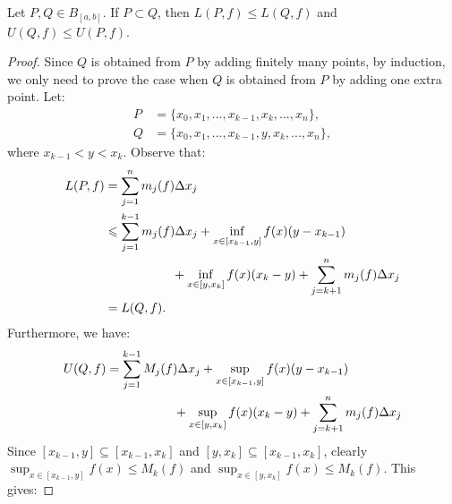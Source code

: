 \documentclass[11pt,twoside,openany]{memoir}
\begin{document}
    \begin{proposition}\label{prop:2}
        Let $P,Q \in B_{[a,b]}$. If $P \subset Q$, then $L(P,f) \leq L(Q,f)$ and $U(Q,f) \leq U(P,f)$.
    \end{proposition}
        \begin{proof}
            Since $Q$ is obtained from $P$ by adding finitely many points, by induction, we only need to prove the case when $Q$ is obtained from $P$ by adding one extra point. Let:
                \begin{equation*}
                \begin{split}
                    P &= \{x_0,x_1,...,x_{k-1},x_k,...,x_n\}, \\
                    Q &= \{x_0,x_1,...,x_{k-1},y,x_k,...,x_n\},
                \end{split}
                \end{equation*}
            where $x_{k-1} < y < x_k$. Observe that:
                \begin{equation*}
                \begin{split}
                    L(P,f) 
                    & = \sum_{j = 1}^n m_j(f)\Delta x_j \\
                    & \leq \sum_{j = 1}^{k-1} m_j(f)\Delta x_j 
                            + \inf_{x \in [x_{k-1},y]} f(x)(y - x_{k-1}) \\
                    & \h9\h9\h9\h9\h9\h9 + \inf_{x \in [y,x_{k}]} f(x)(x_{k} - y) 
                            + \sum_{j = k+1}^n m_j(f)\Delta x_j \\
                    & = L(Q,f).
                \end{split}
                \end{equation*}
            Furthermore, we have:
                \begin{equation*}
                \begin{split}
                    U(Q,f) 
                    & = \sum_{j = 1}^{k-1} M_j(f)\Delta x_j 
                            + \sup_{x \in [x_{k-1},y]} f(x)(y - x_{k-1}) \\
                    & \h9\h9\h9\h9\h9\h9 + \sup_{x \in [y,x_{k}]} f(x)(x_{k} - y) 
                            + \sum_{j = k+1}^n m_j(f)\Delta x_j \\
                \end{split}
                \end{equation*}
            Since $[x_{k-1},y] \subseteq [x_{k-1},x_k]$ and $[y,x_{k}] \subseteq [x_{k-1},x_k]$, clearly $\sup_{x \in [x_{k-1},y]} f(x) \leq M_k(f)$ and $\sup_{x \in [y,x_{k}]} f(x) \leq M_k(f)$. This gives:

\end{proof}
\end{document}
